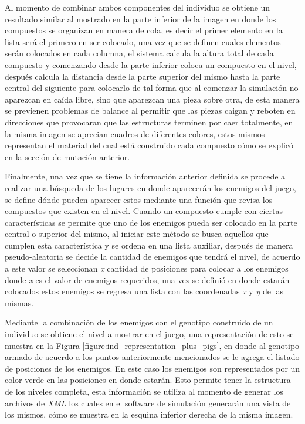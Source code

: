 Al momento de combinar ambos componentes del individuo se obtiene un resultado
similar al mostrado en la parte inferior de la imagen en donde los compuestos se
organizan en manera de cola, es decir el primer elemento en la lista será el
primero en ser colocado, una vez que se definen cuales elementos serán colocados
en cada columna, el sistema calcula la altura total de cada compuesto y
comenzando desde la parte inferior coloca un compuesto en el nivel, después
calcula la distancia desde la parte superior del mismo hasta la parte central
del siguiente para colocarlo de tal forma que al comenzar la simulación no
aparezcan en caída libre, sino que aparezcan una pieza sobre otra, de esta manera
se previenen problemas de balance al permitir que las piezas caigan y
reboten en direcciones que provocaran que las estructuras terminen por caer
totalmente, en la misma imagen se aprecian cuadros de diferentes colores, estos
mismos representan el material del cual está construido cada compuesto cómo se
explicó en la sección de mutación anterior.

Finalmente, una vez que se tiene la información anterior definida se procede a
realizar una búsqueda de los lugares en donde aparecerán los enemigos del juego,
se define dónde pueden aparecer estos mediante una función
que revisa los compuestos que existen en el nivel. Cuando un compuesto cumple
con ciertas características se permite que uno de los enemigos pueda ser
colocado en la parte central o superior del mismo, al iniciar este método se
busca aquellos que cumplen esta característica y se ordena en una lista
auxiliar, después de manera pseudo-aleatoria se decide la cantidad de enemigos
que tendrá el nivel, de acuerdo a este valor se seleccionan \textit{x} cantidad
de posiciones para colocar a los enemigos donde \textit{x} es el valor de
enemigos requeridos, una vez se definió en donde estarán colocados estos
enemigos se regresa una lista con las coordenadas \textit{x} y \textit{y} de las
mismas.

Mediante la combinación de los enemigos con el genotipo construido de un
individuo se obtiene el nivel a mostrar en el juego, una representación de esto
se muestra en la Figura \ref{figure:ind_representation_plus_pigs}, en donde al
genotipo armado de acuerdo a los puntos anteriormente mencionados se le agrega el
listado de posiciones de los enemigos. En este caso los enemigos son
representados por un color verde en las posiciones en donde estarán. 
Esto permite tener la estructura de los niveles completa, esta información se
utiliza al momento de generar los archivos de \textit{XML} los cuales en el
software de simulación generarán una vista de los mismos, cómo se muestra en la
esquina inferior derecha de la misma imagen. 

